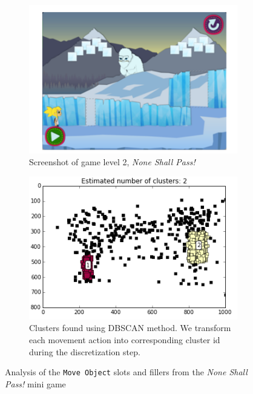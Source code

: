 \documentclass{sigchi}
\begin{document}
	\begin{figure}[ht]
		\centering
		\begin{subfigure}[t]{.5\textwidth}
			\centering
			\includegraphics[width=0.9\columnwidth]{figures/glacier_screenshot.png}
			\caption{Screenshot of game level 2, \textit {None Shall Pass!} \label{fig:screenshot}}
		\end{subfigure}
		\begin{subfigure}[t]{.5\textwidth}
			\centering
			\includegraphics[width=0.9\columnwidth]{figures/glacier_positions.png}
			\caption{Clusters found using DBSCAN method. We transform each movement action into corresponding cluster id during the discretization step. \label{fig:clustering}}
		\end{subfigure}
		\caption{Analysis of the  \texttt{Move Object} slots and fillers from the \textit{None Shall Pass!} mini game\label{fig:figurecluster}}
	\end{figure}
	
\end{document}
